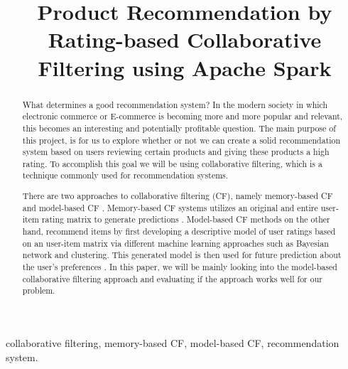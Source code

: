 \documentclass[conference]{IEEEtran}
\begin{document}
\title{Product Recommendation by Rating-based Collaborative Filtering using Apache Spark}

\author{
\and
{}
\and
{}
}

\maketitle

\begin{abstract}

What determines a good recommendation system?  In the modern society in which electronic commerce or E-commerce is becoming more and more popular and relevant, this becomes an interesting and potentially profitable question.  The main purpose of this project, is for us to explore whether or not we can create a solid recommendation system based on users reviewing certain products and giving these products a high rating.  To accomplish this goal we will be using collaborative filtering, which is a technique commonly used for recommendation systems.

There are two approaches to collaborative filtering (CF), namely memory-based CF and model-based CF \cite{Breese}. Memory-based CF systems utilizes an original and entire user-item rating matrix to generate predictions \cite{Resnick}. Model-based CF methods on the other hand, recommend items by first developing a descriptive model of user ratings based on an user-item matrix via different machine learning approaches such as Bayesian network and clustering. This generated model is then used for future prediction about the user's preferences \cite{Breese}. In this paper, we will be mainly looking into the model-based collaborative filtering approach and evaluating if the approach works well for our problem. 

\end{abstract}

\begin{IEEEkeywords}
collaborative filtering, memory-based CF, model-based CF, recommendation system. 
\end{IEEEkeywords}
\end{document}
